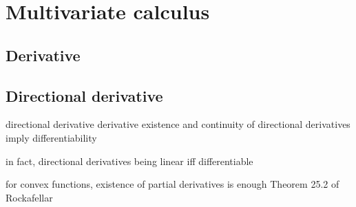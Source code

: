 \chapter{Multivariate calculus}

\section{Derivative}
\label{sec:derivative}

\section{Directional derivative}
\label{sec:directional_derivative}

directional derivative
derivative
existence and continuity of directional derivatives imply differentiability
 
in fact, directional derivatives being linear iff differentiable

for convex functions, existence of partial derivatives is enough
Theorem 25.2 of Rockafellar